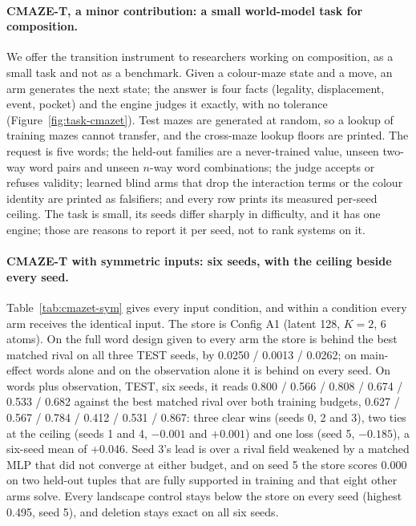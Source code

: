 \documentclass{article} %
\begin{document}
\paragraph{CMAZE-T, a minor contribution: a small world-model task for composition.} We offer the
transition instrument to researchers working on composition, as a small task and not as a benchmark.
Given a colour-maze state and a move, an arm generates the next state; the answer is four facts
(legality, displacement, event, pocket) and the engine judges it exactly, with no tolerance
(Figure~\ref{fig:task-cmazet}). Test mazes are generated at random, so a lookup of training mazes
cannot transfer, and the cross-maze lookup floors are printed. The request is five words; the
held-out families are a never-trained value, unseen two-way word pairs and unseen $n$-way word
combinations; the judge accepts or refuses validity; learned blind arms that drop the interaction
terms or the colour identity are printed as falsifiers; and every row prints its measured per-seed
ceiling. The task is small, its seeds differ sharply in difficulty, and it has one engine; those are
reasons to report it per seed, not to rank systems on it.

\paragraph{CMAZE-T with symmetric inputs: six seeds, with the ceiling beside every seed.}
Table~\ref{tab:cmazet-sym} gives every input condition, and within a condition every arm receives the
identical input. The store is Config A1 (latent 128, $K=2$, 6 atoms). On the full word design given
to every arm the store is behind the best matched rival on all three TEST seeds, by 0.0250 / 0.0013 /
0.0262; on main-effect words alone and on the observation alone it is behind on every seed. On words
plus observation, TEST, six seeds, it reads 0.800 / 0.566 / 0.808 / 0.674 / 0.533 / 0.682 against the
best matched rival over both training budgets, 0.627 / 0.567 / 0.784 / 0.412 / 0.531 / 0.867: three
clear wins (seeds 0, 2 and 3), two ties at the ceiling (seeds 1 and 4, $-0.001$ and $+0.001$) and
one loss (seed 5, $-0.185$), a six-seed mean of +0.046. Seed 3's lead is over a rival field weakened
by a matched MLP that did not converge at either budget, and on seed 5 the store scores 0.000 on two
held-out tuples that are fully supported in training and that eight other arms solve. Every landscape
control stays below the store on every seed (highest 0.495, seed 5), and deletion stays exact on all
six seeds.
\end{document}
